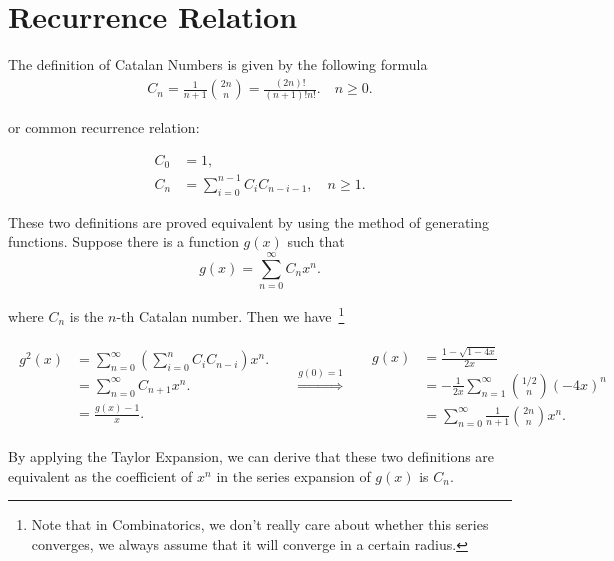 \section{Recurrence Relation}
The definition of Catalan Numbers is given by the following formula
\begin{equation}
    \begin{aligned}
        C_n = \frac{1}{n+1}\binom{2n}{n} = \frac{(2n)!}{(n+1)!n!}.\quad n \geq 0. 
    \end{aligned}
\end{equation}

or common recurrence relation:

\begin{equation}
    \begin{aligned}
        C_0     & = 1,                                          \\
        C_{n} & = \sum_{i=0}^{n-1} C_i C_{n-i-1}, \quad n \geq 1.
    \end{aligned}
\end{equation}

These two definitions are proved equivalent by using the method of generating functions.
Suppose there is a function $g(x)$ such that
\begin{equation}
    g(x) = \sum_{n=0}^{\infty} C_n x^n. \label{generating-function}
\end{equation}


where $C_n$ is the $n$-th Catalan number. Then we have~\footnote[1]{Note that in Combinatorics, we don't really care about whether this series converges, we always assume that it will converge in a certain radius.}

\begin{equation}
    \begin{split}
        \begin{aligned}
            g^2(x)
             & = \sum_{n=0}^{\infty} \left(\sum_{i=0}^{n} C_i C_{n-i}\right) x^n. \\
             & = \sum_{n=0}^{\infty} C_{n+1} x^n.                                 \\
             & = \frac{g(x) - 1}{x}.
        \end{aligned}
    \end{split}
    \quad \stackrel{g(0)=1}{\Longrightarrow} \quad
    \begin{split}
        \begin{aligned}
            g(x)
             & = \frac{1 - \sqrt{1 - 4x}}{2x}                               \\
             & = -\frac{1}{2x}\sum_{n=1}^{\infty}\binom{1 / 2}{n}(-4 x)^{n} \\
             & = \sum_{n=0}^{\infty} \frac{1}{n+1}\binom{2n}{n}x^n.
        \end{aligned}
    \end{split}
\end{equation}


\noindent By applying the Taylor Expansion, we can derive that these two definitions are equivalent as the coefficient of $x^n$ in the series expansion of $g(x)$ is $C_n$.